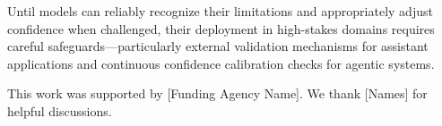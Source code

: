 \documentclass{article}
\begin{document}
Until models can reliably recognize their limitations and appropriately adjust confidence when challenged, their deployment in high-stakes domains requires careful safeguards—particularly external validation mechanisms for assistant applications and continuous confidence calibration checks for agentic systems.




\begin{ack}


This work was supported by [Funding Agency Name]. We thank [Names] for helpful discussions.
\end{ack}


\appendix
\end{document}
